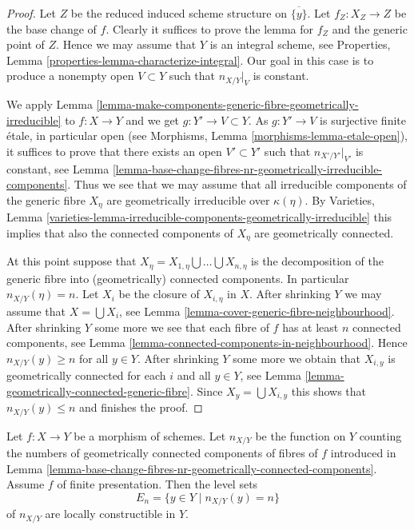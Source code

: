\begin{proof}
Let $Z$ be the reduced induced scheme structure on $\overline{\{y\}}$.
Let $f_Z : X_Z \to Z$ be the base change of $f$. Clearly it suffices to prove
the lemma for $f_Z$ and the generic point of $Z$. Hence we may assume that
$Y$ is an integral scheme, see
Properties, Lemma \ref{properties-lemma-characterize-integral}.
Our goal in this case is to produce a nonempty open $V \subset Y$ such that
$n_{X/Y}|_V$ is constant.

\medskip\noindent
We apply
Lemma \ref{lemma-make-components-generic-fibre-geometrically-irreducible}
to $f : X \to Y$ and we get $g : Y' \to V \subset Y$. As $g : Y' \to V$ is
surjective finite \'etale, in particular open (see
Morphisms, Lemma \ref{morphisms-lemma-etale-open}),
it suffices to prove that there exists an open $V' \subset Y'$
such that $n_{X'/Y'}|_{V'}$ is constant, see
Lemma \ref{lemma-base-change-fibres-nr-geometrically-irreducible-components}.
Thus we see that we may assume that all irreducible components of
the generic fibre $X_\eta$ are geometrically irreducible over $\kappa(\eta)$.
By
Varieties, Lemma
\ref{varieties-lemma-irreducible-components-geometrically-irreducible}
this implies that also the connected components of $X_\eta$ are
geometrically connected.

\medskip\noindent
At this point suppose that
$X_\eta = X_{1, \eta} \bigcup \ldots \bigcup X_{n, \eta}$
is the decomposition of the generic fibre into
(geometrically) connected components.
In particular $n_{X/Y}(\eta) = n$.
Let $X_i$ be the closure of
$X_{i, \eta}$ in $X$. After shrinking $Y$ we may assume that
$X = \bigcup X_i$, see
Lemma \ref{lemma-cover-generic-fibre-neighbourhood}.
After shrinking $Y$ some more we see that each fibre of
$f$ has at least $n$ connected components, see
Lemma \ref{lemma-connected-components-in-neighbourhood}.
Hence $n_{X/Y}(y) \geq n$ for all $y \in Y$.
After shrinking $Y$ some more we obtain that $X_{i, y}$
is geometrically connected for each $i$ and all $y \in Y$, see
Lemma \ref{lemma-geometrically-connected-generic-fibre}.
Since $X_y = \bigcup X_{i, y}$
this shows that $n_{X/Y}(y) \leq n$ and finishes the proof.
\end{proof}

\begin{lemma}
\label{lemma-nr-geom-connected-components-constructible}
Let $f : X \to Y$ be a morphism of schemes. Let
$n_{X/Y}$ be the function on $Y$ counting the numbers of geometrically
connected components of fibres of $f$ introduced in
Lemma \ref{lemma-base-change-fibres-nr-geometrically-connected-components}.
Assume $f$ of finite presentation. Then the level sets
$$
E_n = \{y \in Y \mid n_{X/Y}(y) = n\}
$$
of $n_{X/Y}$ are locally constructible in $Y$.
\end{lemma}

